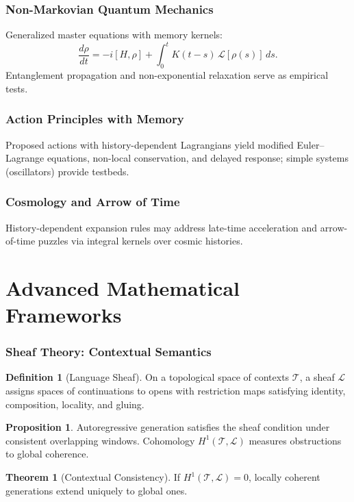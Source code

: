 \documentclass[12pt,a4paper]{article}
\theoremstyle{definition}
\newtheorem{definition}{Definition}[section]
\newtheorem{proposition}{Proposition}[section]
\newtheorem{theorem}{Theorem}[section]
\begin{document}
\section{Non-Markovian Quantum Mechanics}
Generalized master equations with memory kernels:
\[
\frac{d\rho}{dt}=-i[H,\rho]+\int_0^t K(t-s)\,\mathcal{L}[\rho(s)]\,ds.
\]
Entanglement propagation and non-exponential relaxation serve as empirical tests.

\section{Action Principles with Memory}
Proposed actions with history-dependent Lagrangians yield modified Euler–Lagrange equations, non-local conservation, and delayed response; simple systems (oscillators) provide testbeds.

\section{Cosmology and Arrow of Time}
History-dependent expansion rules may address late-time acceleration and arrow-of-time puzzles via integral kernels over cosmic histories.

\part{Advanced Mathematical Frameworks}

\section{Sheaf Theory: Contextual Semantics}
\begin{definition}[Language Sheaf]
On a topological space of contexts $\mathcal{T}$, a sheaf $\mathcal{L}$ assigns spaces of continuations to opens with restriction maps satisfying identity, composition, locality, and gluing.
\end{definition}
\begin{proposition}
Autoregressive generation satisfies the sheaf condition under consistent overlapping windows. Cohomology $H^1(\mathcal{T},\mathcal{L})$ measures obstructions to global coherence.
\end{proposition}
\begin{theorem}[Contextual Consistency]
If $H^1(\mathcal{T},\mathcal{L})=0$, locally coherent generations extend uniquely to global ones.
\end{theorem}
\end{document}
